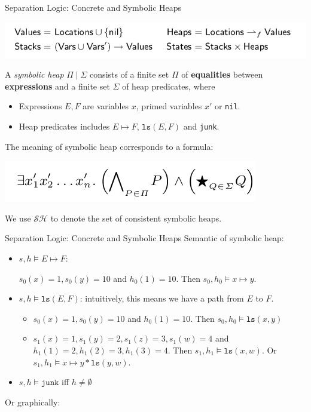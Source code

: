 \documentclass[aspectratio=1610, 13pt]{beamer}
\begin{document}
\iffalse
\begin{frame}{Separation Logic: Concrete and Symbolic Heaps}
    \begin{center}
        \includegraphics[scale=0.4]{conc_sema.png}
    \end{center}
    \begin{definition}
    A \emph{symbolic heap} $\Pi\mid \Sigma$ consists of a finite set $\Pi$ of \textbf{equalities} between \textbf{expressions} and a finite set $\Sigma$ of heap predicates, where
    \begin{itemize}
        \item Expressions $E,F$ are variables $x$, primed variables $x'$ or \texttt{nil}.
        \item Heap predicates includes $E\mapsto F$, $\texttt{ls}(E,F)$ and \texttt{junk}.
    \end{itemize}
    \end{definition}
    The meaning of symbolic heap corresponds to a formula:
    \begin{center}
        \includegraphics[scale=0.4]{sl_form.png}
    \end{center}
    We use $\mathcal{SH}$ to denote the set of consistent symbolic heaps.
\end{frame}

\begin{frame}{Separation Logic: Concrete and Symbolic Heaps}
Semantic of symbolic heap:
    \begin{example}
    \begin{itemize}
        \item $s,h\models E\mapsto F$: 
        
        $s_0(x) = 1, s_0(y) = 10$ and $h_0(1) = 10$. Then $s_0,h_0\models x\mapsto y$.
        \item $s,h\models \texttt{ls}(E,F)$: intuitively, this means we have a path from $E$ to $F$.
        \begin{itemize}
            \item $s_0(x) = 1, s_0(y) = 10$ and $h_0(1) = 10$. Then $s_0,h_0\models \texttt{ls}(x,y)$
            \item $s_1(x) = 1, s_1(y) = 2, s_1(z) = 3, s_1(w) = 4$ and $h_1(1) = 2, h_1(2)=3, h_1(3) = 4$. Then $s_1, h_1\models \texttt{ls}(x,w)$. Or $s_1, h_1\models x\mapsto y * \texttt{ls}(y,w)$.
        \end{itemize}
        
        
        \item $s,h\models \texttt{junk}$ iff $h\ne \emptyset$
    \end{itemize}
    Or graphically:
    \end{example}
\end{frame}
\end{document}
